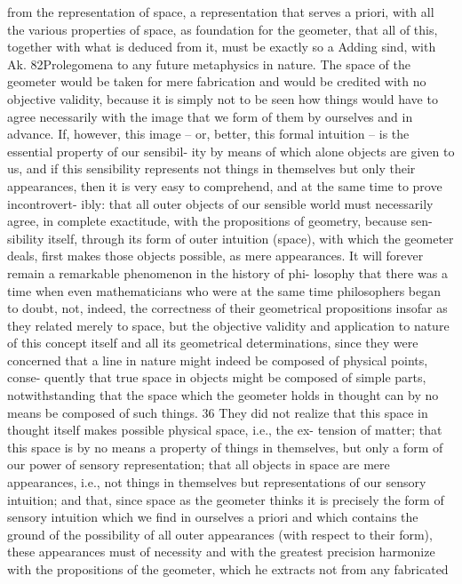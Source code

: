 from the representation of space, a representation that serves a priori,
with all the various properties of space, as foundation for the geometer,
that all of this, together with what is deduced from it, must be exactly so
a
Adding sind, with Ak.
82Prolegomena to any future metaphysics
in nature. The space of the geometer would be taken for mere fabrication
and would be credited with no objective validity, because it is simply not
to be seen how things would have to agree necessarily with the image that
we form of them by ourselves and in advance. If, however, this image –
or, better, this formal intuition – is the essential property of our sensibil-
ity by means of which alone objects are given to us, and if this sensibility
represents not things in themselves but only their appearances, then it
is very easy to comprehend, and at the same time to prove incontrovert-
ibly: that all outer objects of our sensible world must necessarily agree,
in complete exactitude, with the propositions of geometry, because sen-
sibility itself, through its form of outer intuition (space), with which the
geometer deals, ﬁrst makes those objects possible, as mere appearances.
It will forever remain a remarkable phenomenon in the history of phi-
losophy that there was a time when even mathematicians who were at
the same time philosophers began to doubt, not, indeed, the correctness
of their geometrical propositions insofar as they related merely to space,
but the objective validity and application to nature of this concept itself
and all its geometrical determinations, since they were concerned that
a line in nature might indeed be composed of physical points, conse-
quently that true space in objects might be composed of simple parts,
notwithstanding that the space which the geometer holds in thought can
by no means be composed of such things. 36 They did not realize that
this space in thought itself makes possible physical space, i.e., the ex-
tension of matter; that this space is by no means a property of things in
themselves, but only a form of our power of sensory representation; that
all objects in space are mere appearances, i.e., not things in themselves
but representations of our sensory intuition; and that, since space as the
geometer thinks it is precisely the form of sensory intuition which we
ﬁnd in ourselves a priori and which contains the ground of the possibility
of all outer appearances (with respect to their form), these appearances
must of necessity and with the greatest precision harmonize with the
propositions of the geometer, which he extracts not from any fabricated
